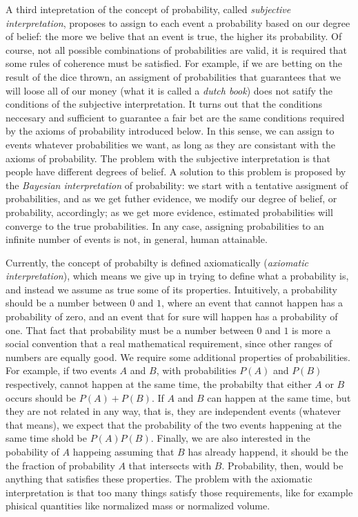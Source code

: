 A third intepretation of the concept of probability, called \emph{subjective interpretation}, proposes to assign to each event a probability based on our degree of belief: the more we belive that an event is true, the higher its probability. Of course, not all possible combinations of probabilities are valid, it is required that some rules of coherence must be satisfied. For example, if we are betting on the result of the dice thrown, an assigment of probabilities that guarantees that we will loose all of our money (what it is called a \emph{dutch book}) does not satify the conditions of the subjective interpretation. It turns out that the conditions neccesary and sufficient to guarantee a fair bet are the same conditions required by the axioms of probability introduced below. In this sense, we can assign to events whatever probabilities we want, as long as they are consistant with the axioms of probability. The problem with the subjective interpretation is that people have different degrees of belief. A solution to this problem is proposed by the \emph{Bayesian interpretation} of probability: we start with a tentative assigment of probabilities, and as we get futher evidence, we modify our degree of belief, or probability, accordingly; as we get more evidence, estimated probabilities will converge to the true probabilities. In any case, assigning probabilities to an infinite number of events is not, in general, human attainable. 

Currently, the concept of probabilty is defined axiomatically (\emph{axiomatic interpretation}), which means we give up in trying to define what a probability is, and instead we assume as true some of its properties. Intuitively, a probability should be a number between $0$ and $1$, where an event that cannot happen has a probability of zero, and an event that for sure will happen has a probability of one. That fact that probability must be a number between $0$ and $1$ is more a social convention that a real mathematical requirement, since other ranges of numbers are equally good. We require some additional properties of probabilities. For example, if two events $A$ and $B$, with probabilities $P \left( A \right)$ and $P \left( B \right)$ respectively, cannot happen at the same time, the probabilty that either $A$ or $B$ occurs should be $P \left( A \right) + P \left( B \right)$. If $A$ and $B$ can happen at the same time, but they are not related in any way, that is, they are independent events (whatever that means), we expect that the probability of the two events happening at the same time shold be $P \left( A \right) P \left( B \right)$. Finally, we are also interested in the pobability of $A$ happeing assuming that $B$ has already happend, it should be the the fraction of probability $A$ that intersects with $B$. Probability, then, would be anything that satisfies these properties. The problem with the axiomatic interpretation is that too many things satisfy those requirements, like for example phisical quantities like normalized mass or normalized volume.

